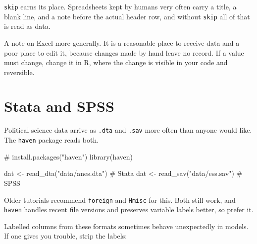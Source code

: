 \documentclass[
  a4paper,
]{scrbook}
\newenvironment{Shaded}{\begin{snugshade}}{\end{snugshade}}
\newcommand{\CommentTok}[1]{\textcolor[rgb]{0.37,0.37,0.37}{#1}}
\newcommand{\FunctionTok}[1]{\textcolor[rgb]{0.28,0.35,0.67}{#1}}
\newcommand{\NormalTok}[1]{\textcolor[rgb]{0.00,0.23,0.31}{#1}}
\newcommand{\OtherTok}[1]{\textcolor[rgb]{0.00,0.23,0.31}{#1}}
\newcommand{\SpecialCharTok}[1]{\textcolor[rgb]{0.37,0.37,0.37}{#1}}
\newcommand{\StringTok}[1]{\textcolor[rgb]{0.13,0.47,0.30}{#1}}
\begin{document}
\texttt{skip} earns its place. Spreadsheets kept by humans very often
carry a title, a blank line, and a note before the actual header row,
and without \texttt{skip} all of that is read as data.

A note on Excel more generally. It is a reasonable place to receive data
and a poor place to edit it, because changes made by hand leave no
record. If a value must change, change it in R, where the change is
visible in your code and reversible.

\section*{Stata and SPSS}\label{stata-and-spss}


Political science data arrive as \texttt{.dta} and \texttt{.sav} more
often than anyone would like. The \texttt{haven} package reads both.

\begin{Shaded}
\begin{Highlighting}[]
\CommentTok{\# install.packages("haven")}
\FunctionTok{library}\NormalTok{(haven)}

\NormalTok{dat }\OtherTok{\textless{}{-}} \FunctionTok{read\_dta}\NormalTok{(}\StringTok{"data/anes.dta"}\NormalTok{)   }\CommentTok{\# Stata}
\NormalTok{dat }\OtherTok{\textless{}{-}} \FunctionTok{read\_sav}\NormalTok{(}\StringTok{"data/ess.sav"}\NormalTok{)    }\CommentTok{\# SPSS}
\end{Highlighting}
\end{Shaded}

Older tutorials recommend \texttt{foreign} and \texttt{Hmisc} for this.
Both still work, and \texttt{haven} handles recent file versions and
preserves variable labels better, so prefer it.

Labelled columns from these formats sometimes behave unexpectedly in
models. If one gives you trouble, strip the labels:

\begin{Shaded}
\end{Shaded}
\end{document}
